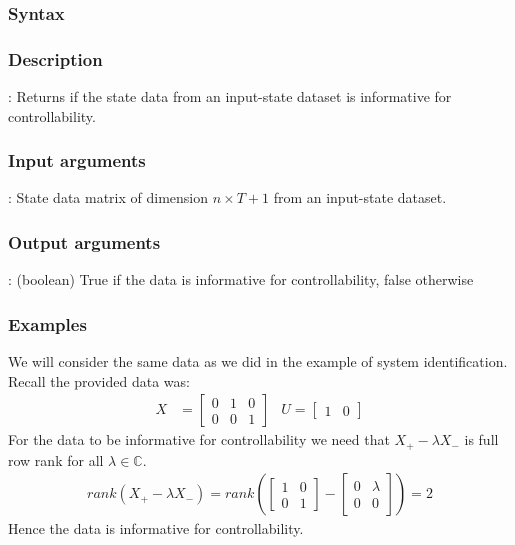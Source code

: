 \subsubsection*{Syntax}

\subsubsection*{Description}
: Returns if the state data from an input-state dataset is informative for controllability.

\subsubsection*{Input arguments}
\textbf{}: State data matrix of dimension $n \times T+1$ from an input-state dataset.

\subsubsection*{Output arguments}
\textbf{}: (boolean) True if the data is informative for controllability, false otherwise

\subsubsection*{Examples}
We will consider the same data as we did in the example of system identification. Recall the provided data was:
\begin{align*}
X &= \begin{bmatrix} 0&1&0 \\ 0&0&1 \end{bmatrix} & U = \begin{bmatrix}	1&0	\end{bmatrix}
\end{align*} 
For the data to be informative for controllability we need that $X_+ - \lambda X_-$ is full row rank for all $\lambda \in \mathbb{C}$.
\begin{align*}
rank(X_+ - \lambda X_-) = rank\left(\begin{bmatrix} 1&0\\0&1\end{bmatrix} - \begin{bmatrix} 0&\lambda\\0&0\end{bmatrix}\right) = 2
\end{align*}
Hence the data is informative for controllability. 

